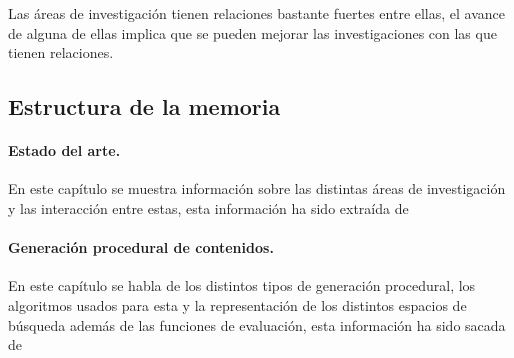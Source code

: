 Las áreas de investigación tienen relaciones bastante fuertes entre ellas, el avance de alguna de ellas implica que se pueden mejorar las investigaciones con las que tienen relaciones.


%
%
\subsection*{Estructura de la memoria}

\paragraph*{Estado del arte.}
En este capítulo se muestra información sobre las distintas áreas de investigación y las interacción entre estas, esta información ha sido extraída de \cite{B1}

\paragraph*{Generación procedural de contenidos.}
En este capítulo se habla de los distintos tipos de generación procedural, los algoritmos usados para esta y la representación de los distintos espacios de búsqueda además de las funciones de evaluación, esta información ha sido sacada de \cite{B1}\cite{B2}\cite{B3}\cite{B4}\cite{B5}\cite{B6}\cite{B7}\cite{B8}

